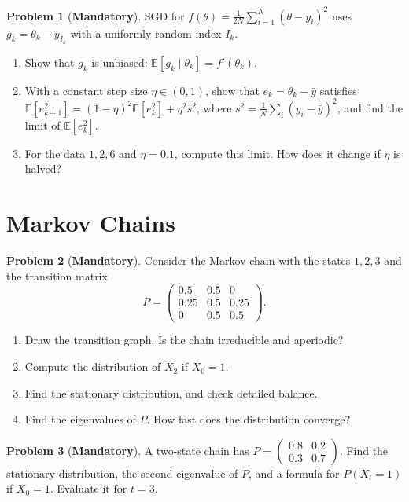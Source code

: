 \documentclass[11pt]{article}
\theoremstyle{definition}
\newtheorem{problem}{Problem}[section]
\newcommand{\mandatory}{\textcolor{red!70!black}{\textbf{Mandatory}}}
\newcommand{\E}{\mathbb{E}}
\begin{document}
\begin{problem}[\mandatory]\label{pr:sgd-practice}
    SGD for $f(\theta) = \frac{1}{2N}\sum_{i=1}^N (\theta - y_i)^2$ uses $g_k = \theta_k - y_{I_k}$ with a uniformly random index $I_k$.
    \begin{enumerate}[label=(\alph*)]
        \item Show that $g_k$ is unbiased: $\E[g_k \mid \theta_k] = f'(\theta_k)$.
        \item With a constant step size $\eta \in (0, 1)$, show that $e_k = \theta_k - \bar y$ satisfies $\E[e_{k+1}^2] = (1 - \eta)^2\E[e_k^2] + \eta^2s^2$, where $s^2 = \frac{1}{N}\sum_i (y_i - \bar y)^2$, and find the limit of $\E[e_k^2]$.
        \item For the data $1, 2, 6$ and $\eta = 0.1$, compute this limit. How does it change if $\eta$ is halved?
    \end{enumerate}
\end{problem}

\section{Markov Chains}

\begin{problem}[\mandatory]\label{pr:lazy-chain}
    Consider the Markov chain with the states $1, 2, 3$ and the transition matrix
    \[P = \begin{pmatrix} 0.5 & 0.5 & 0 \\ 0.25 & 0.5 & 0.25 \\ 0 & 0.5 & 0.5 \end{pmatrix}.\]
    \begin{enumerate}[label=(\alph*)]
        \item Draw the transition graph. Is the chain irreducible and aperiodic?
        \item Compute the distribution of $X_2$ if $X_0 = 1$.
        \item Find the stationary distribution, and check detailed balance.
        \item Find the eigenvalues of $P$. How fast does the distribution converge?
    \end{enumerate}
\end{problem}

\begin{problem}[\mandatory]\label{pr:two-state}
    A two-state chain has $P = \begin{pmatrix} 0.8 & 0.2 \\ 0.3 & 0.7 \end{pmatrix}$. Find the stationary distribution, the second eigenvalue of $P$, and a formula for $P(X_t = 1)$ if $X_0 = 1$. Evaluate it for $t = 3$.
\end{problem}
\end{document}
